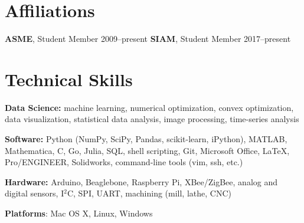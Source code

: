 \documentclass[]{res}
\begin{document}
\begin{resume}
\section{Affiliations}
\vspace{0.1in}

\textbf{ASME}, Student Member \hfill 2009--present
\textbf{SIAM}, Student Member \hfill 2017--present


\section{Technical Skills}
\vspace{0.1in}

\textbf{Data Science:} machine learning, numerical optimization, convex
optimization, data visualization, statistical data analysis, image processing,
time-series analysis

\textbf{Software:} Python (NumPy, SciPy, Pandas, scikit-learn, iPython),
MATLAB, Mathematica, C, Go, Julia, SQL, shell scripting, Git, Microsoft Office,
LaTeX, Pro/ENGINEER, Solidworks, command-line tools (vim, ssh, etc.)

\textbf{Hardware:} Arduino, Beaglebone, Raspberry Pi, XBee/ZigBee, analog and
digital sensors, I$^2$C, SPI, UART, machining (mill, lathe, CNC)

\textbf{Platforms}: Mac OS X, Linux, Windows

\end{resume}
\end{document}
